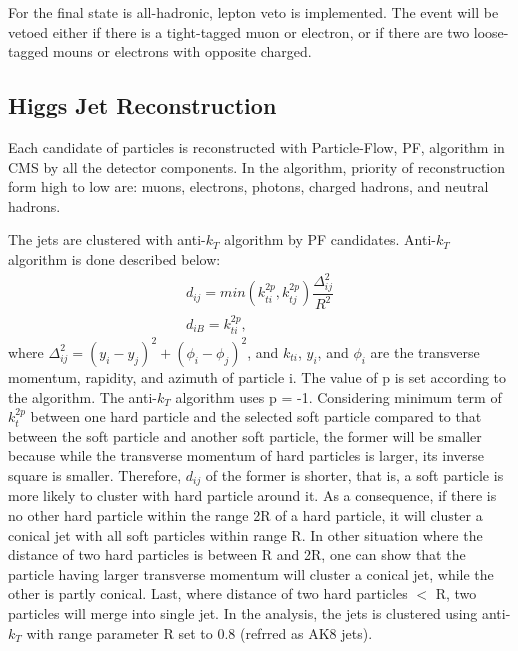 For the final state is all-hadronic, lepton veto is implemented. The event will be vetoed either if there is a tight-tagged muon or electron, or if there are two loose-tagged mouns or electrons with opposite charged.

\subsection{Higgs Jet Reconstruction} 
Each candidate of particles is reconstructed with Particle-Flow, PF, algorithm in CMS by all the detector components\citep{CMS-PAS-PFT-10-001,PFPAS2009}. In the algorithm, priority of reconstruction form high to low are: muons, electrons, photons, charged hadrons, and neutral hadrons.

The jets are clustered with anti-$k_{T}$ algorithm by PF candidates\citep{antiKtAlgorithm}. Anti-$k_{T}$ algorithm is done described below: 
\begin{equation} \label{eq1}
\begin{split}
d_{ij} = min(k^{2p}_{ti},k^{2p}_{tj})\dfrac{\Delta ^2_{ij}}{R^2}\\
d_{iB} = k^{2p}_{ti}, 	
\end{split}
\end{equation}
where $\Delta ^{2}_{ij}= (y_{i}-y_{j})^2+(\phi_{i}-\phi_{j})^2$, and $k_{ti}$, $y_{i}$, and $\phi _{i}$ are the transverse momentum, rapidity, and azimuth of particle i. The value of p is set according to the algorithm. The anti-$k_{T}$ algorithm uses p = -1. 
Considering minimum term of $k^{2p}_{t}$ between one hard particle and the selected soft particle compared to that between the soft particle and another soft particle, the former will be smaller because while the transverse momentum of hard particles is larger, its inverse square is smaller. 
Therefore, $d_{ij}$ of the former is shorter, that is, a soft particle is more likely to cluster with hard particle around it. 
As a consequence, if there is no other hard particle within the range 2R of a hard particle, it will cluster a conical jet with all soft particles within range R. 
In other situation where the distance of two hard particles is between R and 2R, one can show that the particle having larger transverse momentum will cluster a  conical jet, while the other is partly conical.
Last, where distance of two hard particles $<$ R, two particles will merge into single jet. In the analysis, the jets is clustered using anti-$k_{T}$ with range parameter R set to 0.8 (refrred as AK8 jets).


